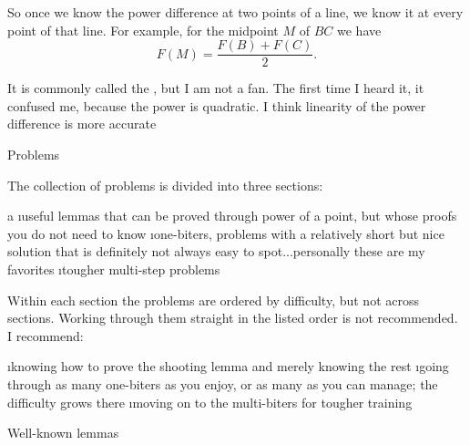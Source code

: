 So once we know the power difference at two points of a line, we know it at every point of that line. For example, for the midpoint $M$ of $BC$ we have
$$
F(M) = \frac{F(B)+F(C)}{2}.
$$

It is commonly called the , but I am not a fan. The first time I heard it, it confused me, because the power is quadratic. I think linearity of the power difference is more accurate \Laugh{}

\sec Problems

The collection of problems is divided into three sections:

\begitems \style a
\i useful lemmas that can be proved through power of a point, but whose proofs you do not need to know
\i one-biters, problems with a relatively short but nice solution that is definitely not always easy to spot...personally these are my favorites
\i tougher multi-step problems
\enditems

Within each section the problems are ordered by difficulty, but not across sections. Working through them straight in the listed order is not recommended. I recommend:

\begitems
\i knowing how to prove the shooting lemma and merely knowing the rest
\i going through as many one-biters as you enjoy, or as many as you can manage; the difficulty grows there
\i moving on to the multi-biters for tougher training
\enditems

\secc Well-known lemmas

